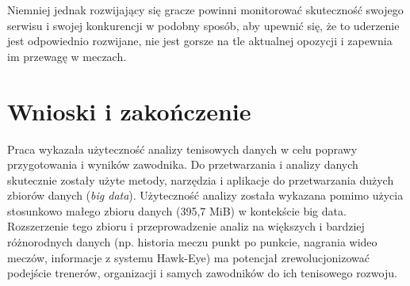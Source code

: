 \documentclass[12pt, a4paper]{article}
\begin{document}
Niemniej jednak rozwijający się gracze powinni monitorować skuteczność swojego serwisu i swojej konkurencji w podobny sposób, aby upewnić się, że to uderzenie jest odpowiednio rozwijane, nie jest gorsze na tle aktualnej opozycji i zapewnia im przewagę w meczach.



\section{Wnioski i zakończenie}
Praca wykazała użyteczność analizy tenisowych danych w celu poprawy przygotowania i wyników zawodnika. Do przetwarzania i analizy danych skutecznie zostały użyte metody, narzędzia i aplikacje do przetwarzania dużych zbiorów danych (\textit{big data}). Użyteczność analizy została wykazana pomimo użycia stosunkowo małego zbioru danych (395,7 MiB) w kontekście big data. Rozszerzenie tego zbioru i przeprowadzenie analiz na większych i bardziej różnorodnych danych (np. historia meczu punkt po punkcie, nagrania wideo meczów, informacje z systemu Hawk-Eye) ma potencjał zrewolucjonizować podejście trenerów, organizacji i samych zawodników do ich tenisowego rozwoju.
\end{document}
